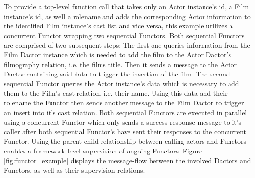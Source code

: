 To provide a top-level function call that takes only an Actor instance's id, a Film instance's id, as well a rolename and adds the corresponding Actor information to the identified Film instance's cast list and vice versa, this example utilizes a concurrent Functor wrapping two sequential Functors.
Both sequential Functors are comprised of two subsequent steps:
The first one queries information from the Film Dactor instance which is needed to add the film to the Actor Dactor's filmography \gls{relation}, i.e. the films title.
Then it sends a message to the Actor Dactor containing said data to trigger the insertion of the film.
The second sequential Functor queries the Actor instance's data which is necessary to add them to the Film's cast \gls{relation}, i.e. their name. Using this data and their rolename the Functor then sends another message to the Film Dactor to trigger an insert into it's cast \gls{relation}.
Both sequential Functors are executed in parallel using a concurrent Functor which only sends a success-response message to it's caller after both sequential Functor's have sent their responses to the concurrent Functor.
Using the parent-child relationship between calling actors and Functors enables a framework-level supervision of ongoing Functors.
Figure \ref{fig:functor_example} displays the message-flow between the involved Dactors and Functors, as well as their supervision \glspl{relation}.



